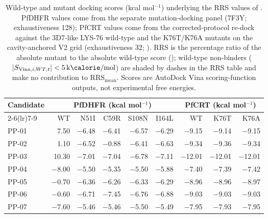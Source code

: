 
\begin{table}[ht!]
\centering
\caption{Wild-type and mutant docking scores (kcal mol$^{-1}$) underlying the RRS values of . PfDHFR values come from the separate mutation-docking panel (7F3Y; exhaustiveness 128); PfCRT values come from the corrected-protocol re-dock against the 3D7-like LYS-76 wild-type and the K76T/K76A mutants on the cavity-anchored V2 grid (exhaustiveness 32; ). RRS is the percentage ratio of the absolute mutant to the absolute wild-type score (); wild-type non-binders ($|S_{\mathrm{Vina},i,WT,t}|<\qty{5}{\kilo\calorie\per\mole}$) are shaded by dashes in the RRS table and make no contribution to RRS$_{\mathrm{mean}}$. Scores are AutoDock Vina scoring-function outputs, not experimental free energies.}
\label{tab:sm_wt_mutant_scores}
\small
\begin{tabular}{@{}lrrrrrrrr@{}}
\toprule
Candidate & \multicolumn{5}{c}{PfDHFR (kcal mol$^{-1}$)} & \multicolumn{3}{c}{PfCRT (kcal mol$^{-1}$)} \\
\cmidrule(lr){2-6}\cmidrule(lr){7-9}
 & WT & N51I & C59R & S108N & I164L & WT & K76T & K76A \\
\midrule
PP-01 & \num{7.50} & \num{-6.48} & \num{-6.41} & \num{-6.57} & \num{-6.29} & \num{-9.15} & \num{-9.14} & \num{-9.15} \\
PP-02 & \num{1.10} & \num{-6.52} & \num{-0.88} & \num{-6.41} & \num{-6.63} & \num{-9.34} & \num{-9.36} & \num{-9.34} \\
PP-03 & \num{10.30} & \num{-7.01} & \num{-7.04} & \num{-6.78} & \num{-7.11} & \num{-12.01} & \num{-12.01} & \num{-12.01} \\
PP-04 & \num{-8.00} & \num{-5.50} & \num{-5.35} & \num{-5.50} & \num{-5.88} & \num{-7.40} & \num{-7.39} & \num{-7.42} \\
PP-05 & \num{-0.70} & \num{-6.36} & \num{-6.26} & \num{-6.33} & \num{-6.29} & \num{-8.96} & \num{-8.96} & \num{-8.97} \\
PP-06 & \num{-0.60} & \num{-6.71} & \num{-7.45} & \num{-6.76} & \num{-6.88} & \num{-9.03} & \num{-9.03} & \num{-9.03} \\
PP-07 & \num{-7.60} & \num{-5.46} & \num{-5.46} & \num{-5.50} & \num{-5.49} & \num{-7.95} & \num{-7.93} & \num{-7.95} \\

\end{tabular}
\end{table}
